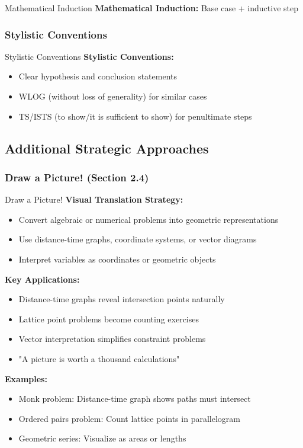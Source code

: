 \documentclass[12pt]{article}
\begin{document}
	\begin{strategybox}{Mathematical Induction}
		\textbf{Mathematical Induction:} Base case + inductive step
	\end{strategybox}

	\subsubsection{Stylistic Conventions}

	\begin{strategybox}{Stylistic Conventions}
		\textbf{Stylistic Conventions:}
		\begin{itemize}
			\item Clear hypothesis and conclusion statements
			\item WLOG (without loss of generality) for similar cases
			\item TS/ISTS (to show/it is sufficient to show) for penultimate steps
		\end{itemize}
	\end{strategybox}

	\subsection{Additional Strategic Approaches}
	
	\subsubsection{Draw a Picture! (Section 2.4)}

\begin{strategybox}{Draw a Picture!}
	\textbf{Visual Translation Strategy:}
	\begin{itemize}
		\item Convert algebraic or numerical problems into geometric representations
		\item Use distance-time graphs, coordinate systems, or vector diagrams
		\item Interpret variables as coordinates or geometric objects
	\end{itemize}
	
	\textbf{Key Applications:}
	\begin{itemize}
		\item Distance-time graphs reveal intersection points naturally
		\item Lattice point problems become counting exercises
		\item Vector interpretation simplifies constraint problems
		\item "A picture is worth a thousand calculations"
	\end{itemize}
	
	\textbf{Examples:}
	\begin{itemize}
		\item Monk problem: Distance-time graph shows paths must intersect
		\item Ordered pairs problem: Count lattice points in parallelogram
		\item Geometric series: Visualize as areas or lengths
	\end{itemize}
\end{strategybox}
\end{document}
